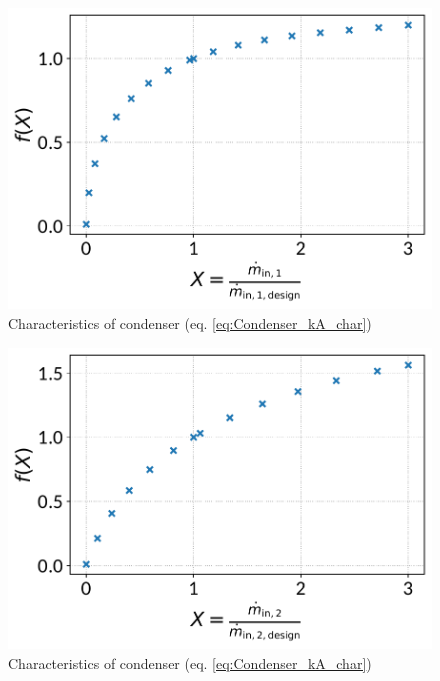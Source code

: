 \documentclass[]{article}
\begin{document}
\begin{minipage}{0.5\textwidth}
\begin{figure}[H]\begin{center}
\includegraphics[width=\textwidth]{figures/Condenser_CharLine_kA_char1_condenser.pdf}
\caption{Characteristics of condenser (eq. \ref{eq:Condenser_kA_char})}
\label{fig:CharLine_kA_char1_condenser}
\end{center}\end{figure}

\end{minipage}
\begin{minipage}{0.5\textwidth}
\begin{figure}[H]\begin{center}
\includegraphics[width=\textwidth]{figures/Condenser_CharLine_kA_char2_condenser.pdf}
\caption{Characteristics of condenser (eq. \ref{eq:Condenser_kA_char})}
\label{fig:CharLine_kA_char2_condenser}
\end{center}\end{figure}

\end{minipage}
\end{document}

